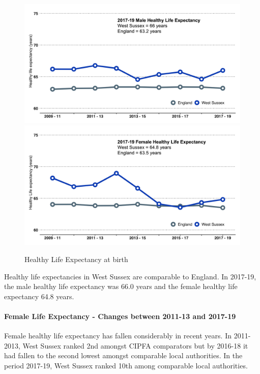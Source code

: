 \begin{figure}[htp]
    \caption{Healthy Life Expectancy at birth}
    \centering
	\includegraphics[width=\linewidth]{images/male_HLE.png}
    \includegraphics[width=\linewidth]{images/female_HLE.png}
	\label{fig:hle_wsx}
\end{figure}

Healthy life expectancies in West Sussex are comparable to England. In 2017-19, the male healthy life expectancy was 66.0 years and the female healthy life expectancy 64.8 years.

\paragraph{Female Life Expectancy - Changes between 2011-13 and 2017-19} Female healthy life expectancy has fallen considerably in recent years. In 2011-2013, West Sussex ranked 2nd amongst CIPFA comparators but by 2016-18 it had fallen to the second lowest amongst comparable local authorities. In the period 2017-19, West Sussex ranked 10th among comparable local authorities.

